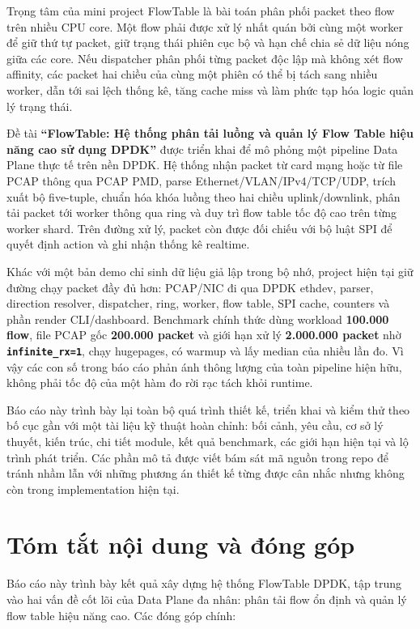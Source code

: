 \documentclass[12pt,a4paper,twoside]{report}
\newcommand{\code}[1]{\texttt{#1}}
\begin{document}
Trọng tâm của mini project FlowTable là bài toán phân phối packet theo flow
trên nhiều CPU core. Một flow phải được xử lý nhất quán bởi cùng một worker để
giữ thứ tự packet, giữ trạng thái phiên cục bộ và hạn chế chia sẻ dữ liệu nóng
giữa các core. Nếu dispatcher phân phối từng packet độc lập mà không xét flow
affinity, các packet hai chiều của cùng một phiên có thể bị tách sang nhiều
worker, dẫn tới sai lệch thống kê, tăng cache miss và làm phức tạp hóa logic
quản lý trạng thái.

Đề tài \textbf{``FlowTable: Hệ thống phân tải luồng và quản lý Flow Table hiệu
năng cao sử dụng DPDK''} được triển khai để mô phỏng một pipeline Data Plane
thực tế trên nền DPDK. Hệ thống nhận packet từ card mạng hoặc từ file PCAP
thông qua PCAP PMD, parse Ethernet/VLAN/IPv4/TCP/UDP, trích xuất bộ five-tuple,
chuẩn hóa khóa luồng theo hai chiều uplink/downlink, phân tải packet tới worker
thông qua ring và duy trì flow table tốc độ cao trên từng worker shard. Trên
đường xử lý, packet còn được đối chiếu với bộ luật SPI để quyết định action và
ghi nhận thống kê realtime.

Khác với một bản demo chỉ sinh dữ liệu giả lập trong bộ nhớ, project hiện tại
giữ đường chạy packet đầy đủ hơn: PCAP/NIC đi qua DPDK ethdev, parser, direction
resolver, dispatcher, ring, worker, flow table, SPI cache, counters và phần
render CLI/dashboard. Benchmark chính thức dùng workload \textbf{100.000 flow},
file PCAP gốc \textbf{200.000 packet} và giới hạn xử lý
\textbf{2.000.000 packet} nhờ \textbf{\code{infinite\_rx=1}}, chạy hugepages,
có warmup và lấy median của nhiều lần đo. Vì vậy các con số trong báo cáo phản
ánh thông lượng của toàn pipeline hiện hữu, không phải tốc độ của một hàm đo
rời rạc tách khỏi runtime.

Báo cáo này trình bày lại toàn bộ quá trình thiết kế, triển khai và kiểm thử
theo bố cục gần với một tài liệu kỹ thuật hoàn chỉnh: bối cảnh, yêu cầu, cơ sở
lý thuyết, kiến trúc, chi tiết module, kết quả benchmark, các giới hạn hiện tại
và lộ trình phát triển. Các phần mô tả được viết bám sát mã nguồn trong repo để
tránh nhầm lẫn với những phương án thiết kế từng được cân nhắc nhưng không còn
trong implementation hiện tại.

\chapter*{Tóm tắt nội dung và đóng góp}
\begingroup
\small
{}
Báo cáo này trình bày kết quả xây dựng hệ thống FlowTable DPDK, tập trung vào
hai vấn đề cốt lõi của Data Plane đa nhân: phân tải flow ổn định và quản lý
flow table hiệu năng cao. Các đóng góp chính:
\end{document}
